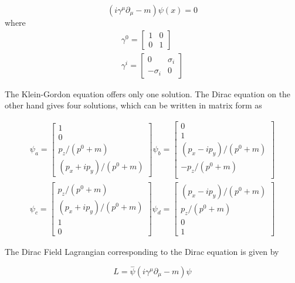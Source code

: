 \begin{equation}
(i\gamma^{\mu}\partial_\mu-m)\psi(x)=0
\end{equation}
where
\begin{eqnarray}
\gamma^0=\begin{bmatrix}
1 & 0\\
0 & 1
\end{bmatrix}\\
\gamma^i=\begin{bmatrix}
0 &  \sigma_i\\
-\sigma_i & 0
\end{bmatrix}
\end{eqnarray}

The Klein-Gordon equation offers only one solution. The Dirac equation on the other hand gives four solutions, which can be written in matrix form as 


\begin{eqnarray}
\psi_a=\begin{bmatrix}
1\\
0\\
p_z/(p^0+m)\\
(p_x+ip_y)/(p^0+m)
\end{bmatrix}
\psi_b=\begin{bmatrix}
0\\
1\\
(p_x-ip_y)/(p^0+m)\\
-p_z/(p^0+m)\\
\end{bmatrix}\\
\psi_c=\begin{bmatrix}
p_z/(p^0+m)\\
(p_x+ip_y)/(p^0+m)\\
1\\
0
\end{bmatrix}
\psi_d=\begin{bmatrix}
(p_x-ip_y)/(p^0+m)\\
p_z/(p^0+m)\\
0\\
1
\end{bmatrix}
\end{eqnarray}

The Dirac Field Lagrangian corresponding to the Dirac equation is given by\cite{lahiri04}

\begin{equation}
{L} = \overset{-}{\psi}(i{\gamma^\mu}\partial_\mu-m)\psi
\end{equation}


